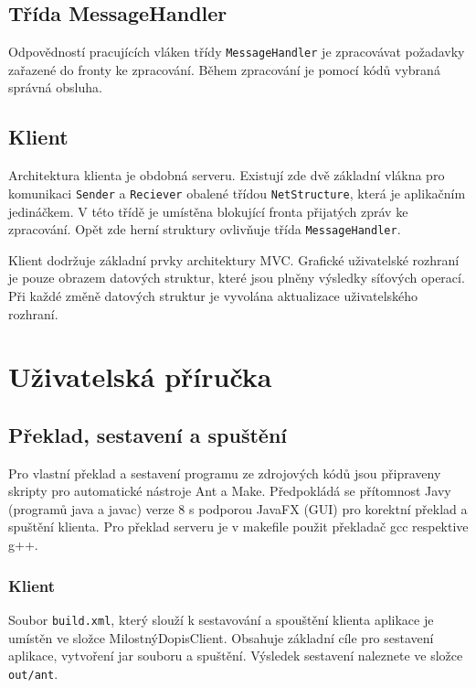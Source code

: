 \documentclass[12pt, a4paper]{article}
\begin{document}
\subsection{Třída MessageHandler}
Odpovědností pracujících vláken třídy \texttt{MessageHandler} je zpracovávat požadavky zařazené do fronty ke zpracování. Během zpracování je pomocí kódů vybraná správná obsluha.


\subsection{Klient}

Architektura klienta je obdobná serveru. Existují zde dvě základní vlákna pro komunikaci \texttt{Sender} a \texttt{Reciever} obalené třídou \texttt{NetStructure}, která je aplikačním jedináčkem. V této třídě je umístěna blokující fronta přijatých zpráv ke zpracování. Opět zde herní struktury ovlivňuje třída \texttt{MessageHandler}.

Klient dodržuje základní prvky architektury MVC. Grafické uživatelské rozhraní je pouze obrazem datových struktur, které jsou plněny výsledky síťových operací. Při každé změně datových struktur je vyvolána aktualizace uživatelského rozhraní.


\section{Uživatelská příručka} %

\subsection{Překlad, sestavení a spuštění }

Pro vlastní překlad a sestavení programu ze zdrojových kódů jsou připraveny skripty pro automatické nástroje Ant a Make. Předpokládá se přítomnost Javy (programů java a javac) verze 8 s podporou JavaFX (GUI) pro korektní překlad a spuštění klienta. Pro překlad serveru je v makefile použit překladač gcc respektive g++.


\subsubsection{Klient}
Soubor \texttt{build.xml}, který slouží k sestavování a spouštění klienta aplikace je umístěn ve složce MilostnýDopisClient. Obsahuje základní cíle pro sestavení aplikace, vytvoření jar souboru a spuštění. Výsledek sestavení naleznete ve složce \texttt{out/ant}.
\end{document}
